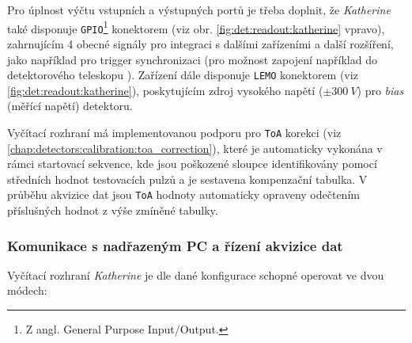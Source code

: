 Pro úplnost výčtu vstupních a výstupných portů je třeba doplnit, že \textit{Katherine} také disponuje \texttt{GPIO}\footnote{Z angl. General Purpose Input/Output.} konektorem (viz obr. \ref{fig:det:readout:katherine} vpravo), zahrnujícím 4 obecné signály pro integraci s dalšími zařízeními a další rozšíření, jako například pro trigger synchronizaci (pro možnost zapojení například do detektorového teleskopu \cite{katherine_telescope}). Zařízení dále disponuje \texttt{LEMO} konektorem (viz \ref{fig:det:readout:katherine}), poskytujícím zdroj vysokého napětí ($\pm300~V$) pro \textit{bias} (měřící napětí) detektoru.

Vyčítací rozhraní má implementovanou podporu pro \texttt{ToA} korekci (viz \ref{chap:detectors:calibration:toa_correction}), které je automaticky vykonána v rámci startovací sekvence, kde jsou poškozené sloupce identifikovány pomocí středních hodnot testovacích pulzů a je sestavena kompenzační tabulka. V průběhu akvizice dat jsou \texttt{ToA} hodnoty automaticky opraveny odečtením příslušných hodnot z výše zmíněné tabulky.

\subsubsection{Komunikace s nadřazeným PC a řízení akvizice dat}\label{chap:detectors:readouts:katherine:comm}
Vyčítací rozhraní \textit{Katherine} je dle dané konfigurace schopné operovat ve dvou módech:

